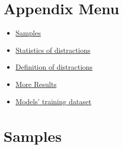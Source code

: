 \clearpage
\setcounter{page}{1}
\maketitlesupplementary


\section{Appendix Menu}
\label{sec:appendix}
\begin{itemize}
    \item \hyperref[sec:samples]{Samples}
    \item \hyperref[sec:appendix-statistics]{Statistics of distractions}
    \item \hyperref[sec:appendix-definition]{Definition of distractions}
        \item \hyperref[sec:appendix-more-results]{More Results}
        \item \hyperref[sec:appendix-model-trainingdataset]{Models' training dataset}
\end{itemize}



\newpage
\section{Samples}
\label{sec:samples}

